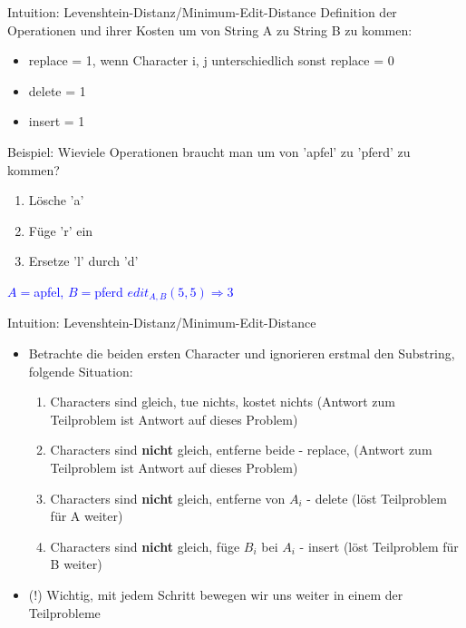 \documentclass[aspectratio=169]{beamer}
\begin{document}
\begin{frame}{Intuition: Levenshtein-Distanz/Minimum-Edit-Distance}
Definition der Operationen und ihrer Kosten um von String A zu String B zu kommen:
\begin{itemize}
    \item replace = 1, wenn Character i, j unterschiedlich sonst replace = 0
    \item delete = 1
    \item insert = 1
\end{itemize}
    \pause
\vspace{5mm}
Beispiel: Wieviele Operationen braucht man um von 'apfel' zu 'pferd' zu kommen? \pause
\begin{enumerate}
    \item Lösche 'a'
    \item Füge 'r' ein
    \item Ersetze 'l' durch 'd'
\end{enumerate}
\textcolor{blue}{$A=$apfel, $B=$pferd $edit_{A,B}(5,5) \Rightarrow 3$}
 \end{frame}
 
\begin{frame}{Intuition: Levenshtein-Distanz/Minimum-Edit-Distance}
\begin{itemize}
 
    \item Betrachte die beiden ersten Character und ignorieren erstmal den Substring, folgende Situation:
    \begin{enumerate}
        \item Characters sind gleich, tue nichts, kostet nichts (Antwort zum Teilproblem ist Antwort auf dieses Problem)
        \item Characters sind \textbf{nicht} gleich, entferne beide - replace, (Antwort zum Teilproblem ist Antwort auf dieses Problem)
        \item Characters sind \textbf{nicht} gleich, entferne von $A_i$ - delete (löst Teilproblem für A weiter)
        \item Characters sind \textbf{nicht} gleich, füge $B_i$ bei $A_i$ - insert (löst Teilproblem für B weiter)
    \end{enumerate}
    \pause
    \item (!) Wichtig, mit jedem Schritt bewegen wir uns weiter in einem der Teilprobleme 
\end{itemize}
\end{frame}
\end{document}
